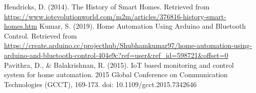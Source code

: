 \documentclass[journal]{IEEEtran}
\begin{document}
\ifCLASSOPTIONcaptionsoff
  \newpage
\fi


%
%
%
\begin{flushleft}
\begin{thebibliography}{1}

Hendricks, D. (2014). The History of Smart Homes. Retrieved from
\url{https://www.iotevolutionworld.com/m2m/articles/376816-history-smart-homes.htm}
Kumar, S. (2019). Home Automation Using Arduino and Bluetooth Control. Retrieved from \url{https://create.arduino.cc/projecthub/Shubhamkumar97/home-automation-using-arduino-and-bluetooth-control-404e9c?ref=user\&ref\_id=598721\&offset=0}
Pavithra, D., \& Balakrishnan, R. (2015). IoT based monitoring and control system for home automation. 2015 Global Conference on Communication Technologies (GCCT), 169-173. doi: 10.1109/gcct.2015.7342646

\end{thebibliography}
\end{flushleft}

\end{document}
